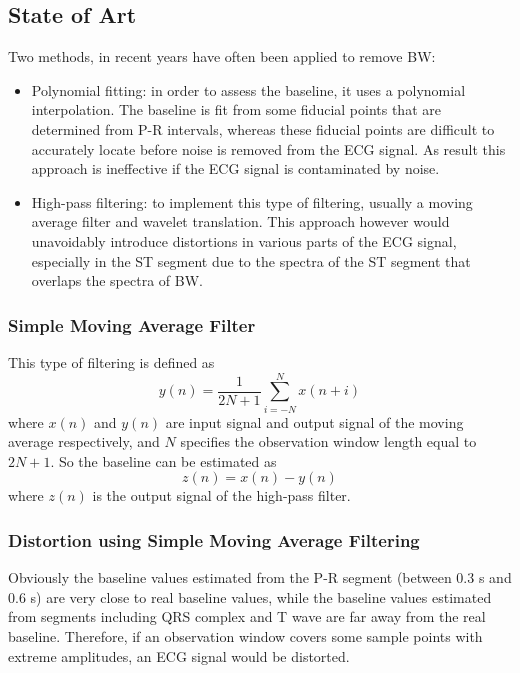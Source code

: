 \subsection{State of Art}
Two methods, in recent years have often been applied to remove BW:
\begin{itemize}
	\item Polynomial fitting: in order to assess the baseline, it uses a polynomial interpolation. The baseline is fit from some fiducial points that are determined from P-R intervals, whereas these fiducial points are difficult to accurately locate before noise is removed from the ECG signal. As result this approach is ineffective if the ECG signal is contaminated by noise.\cite{ref13}
	\item High-pass filtering: to implement this type of filtering, usually a moving average filter\cite{ref14} and wavelet translation\cite{ref15}. This approach however would unavoidably introduce distortions in various parts of the ECG signal, especially in the ST segment due to the spectra of the ST segment that overlaps the spectra of BW.
\end{itemize}

\subsubsection{Simple Moving Average Filter}
This type of filtering is defined as
\begin{equation}
y(n)=\frac{1}{2N+1}\sum_{i=-N}^{N}x(n+i)
\end{equation}
where $x(n)$ and $y(n)$ are input signal and output signal of the moving average respectively, and $N$ specifies the observation window length equal to $2N+1$. So the baseline can be estimated as
\begin{equation}
z(n)=x(n)-y(n)
\end{equation}
where $z(n)$ is the output signal of the high-pass filter.

\subsubsection{Distortion using Simple Moving Average Filtering}
Obviously the baseline values estimated from the P-R segment (between 0.3 s and 0.6 s) are very close to real baseline values, while the baseline values estimated from segments including QRS complex and T wave are far away from the real baseline. Therefore, if an observation window covers some sample points with extreme amplitudes, an ECG signal would be distorted.

